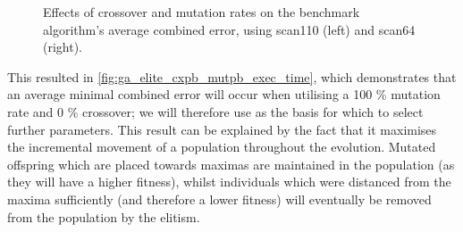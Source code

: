 \documentclass[authoryearcitations]{UoYCSproject}
\begin{document}
\begin{figure}
\begin{subfigure}[b]{0.5\textwidth}
\end{subfigure}
\begin{subfigure}[b]{0.5\textwidth}
\end{subfigure}
	\caption[Optimising crossover \& mutation rates for elitist selection.]{Effects of crossover and mutation rates on the benchmark algorithm's average combined error, using scan110 (left) and scan64 (right).}
	\label{fig:ga_elite_cxpb_mutpb_exec_time}
\end{figure}

This resulted in \autoref{fig:ga_elite_cxpb_mutpb_exec_time}, which demonstrates that an average minimal combined error will occur when utilising a 100 \% mutation rate and 0 \% crossover; we will therefore use as the basis for which to select further parameters. This result can be explained by the fact that it maximises the incremental movement of a population throughout the evolution. Mutated offspring which are placed towards maximas are maintained in the population (as they will have a higher fitness), whilst individuals which were distanced from the maxima sufficiently (and therefore a lower fitness) will eventually be removed from the population by the elitism.
\end{document}
